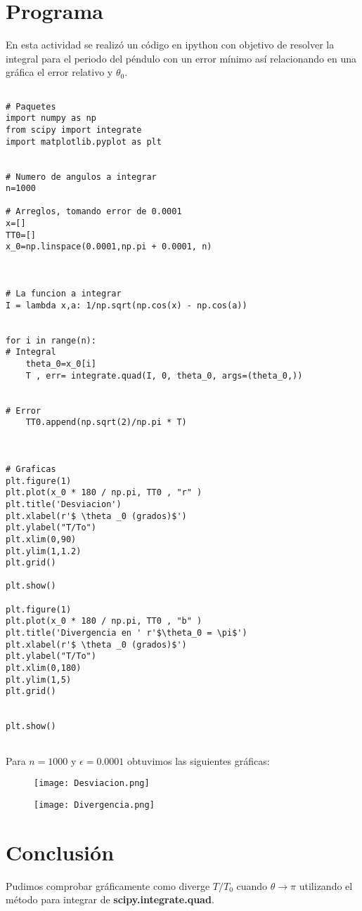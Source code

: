\documentclass[a4 paper]{article}
\numberwithin{equation}{section}
\newcommand{\0}{\mathbf{0}}
\begin{document}
\newpage

\section*{Programa}

En esta actividad se realiz\'o un c\'odigo en ipython con objetivo de resolver la integral para el periodo del p\'endulo con un error m\'inimo as\'i relacionando en una gr\'afica el error relativo y $\theta_{0}$.

\begin{verbatim}

# Paquetes
import numpy as np
from scipy import integrate
import matplotlib.pyplot as plt


# Numero de angulos a integrar
n=1000

# Arreglos, tomando error de 0.0001
x=[]
TT0=[]
x_0=np.linspace(0.0001,np.pi + 0.0001, n)



# La funcion a integrar
I = lambda x,a: 1/np.sqrt(np.cos(x) - np.cos(a))


for i in range(n):
# Integral
    theta_0=x_0[i]
    T , err= integrate.quad(I, 0, theta_0, args=(theta_0,))
    
    
# Error
    TT0.append(np.sqrt(2)/np.pi * T)
    
    
    
# Graficas
plt.figure(1)
plt.plot(x_0 * 180 / np.pi, TT0 , "r" )
plt.title('Desviacion')
plt.xlabel(r'$ \theta _0 (grados)$')
plt.ylabel("T/To")
plt.xlim(0,90)
plt.ylim(1,1.2)
plt.grid()

plt.show()

plt.figure(1)
plt.plot(x_0 * 180 / np.pi, TT0 , "b" )
plt.title('Divergencia en ' r'$\theta_0 = \pi$')
plt.xlabel(r'$ \theta _0 (grados)$')
plt.ylabel("T/To")
plt.xlim(0,180)
plt.ylim(1,5)
plt.grid()


plt.show()


\end{verbatim}

Para $n=1000$ y $\epsilon = 0.0001$ obtuvimos las siguientes gr\'aficas:

\begin{figure}[!ht]
  \centering
      \texttt{[image: Desviacion.png]}
  \caption{}
\end{figure}

\vspace*{0.5cm}

\begin{figure}[!ht]
  \centering
      \texttt{[image: Divergencia.png]}
  \caption{}
\end{figure}

\section*{Conclusi\'on}
Pudimos comprobar gr\'aficamente como diverge $T/T_{0}$ cuando $\theta \rightarrow \pi$ utilizando el m\'etodo para integrar de {\bf scipy.integrate.quad}.
\end{document}
